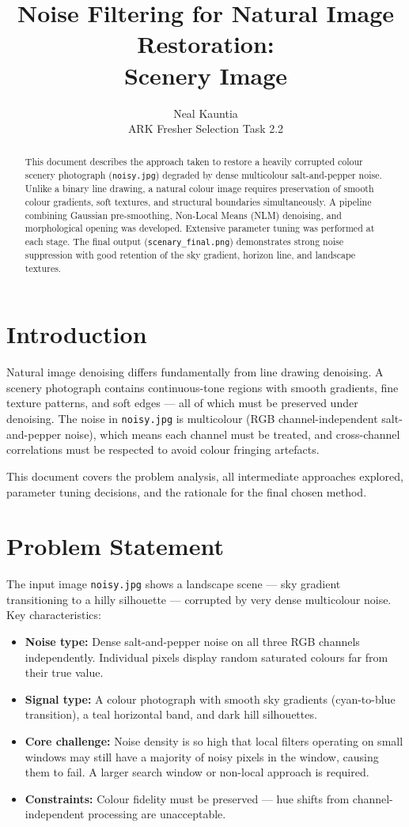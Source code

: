 \documentclass[journal]{IEEEtran}
\title{Noise Filtering for Natural Image Restoration:\\Scenery Image}
\author{Neal Kauntia\\ARK Fresher Selection Task 2.2}
\begin{document}
\maketitle

\begin{abstract}
This document describes the approach taken to restore a heavily corrupted colour scenery 
photograph (\texttt{noisy.jpg}) degraded by dense multicolour salt-and-pepper noise. 
Unlike a binary line drawing, a natural colour image requires preservation of smooth 
colour gradients, soft textures, and structural boundaries simultaneously. A pipeline 
combining Gaussian pre-smoothing, Non-Local Means (NLM) denoising, and morphological 
opening was developed. Extensive parameter tuning was performed at each stage. The 
final output (\texttt{scenary\_final.png}) demonstrates strong noise suppression with 
good retention of the sky gradient, horizon line, and landscape textures.
\end{abstract}

\section{Introduction}
Natural image denoising differs fundamentally from line drawing denoising. A scenery 
photograph contains continuous-tone regions with smooth gradients, fine texture 
patterns, and soft edges — all of which must be preserved under denoising. The noise 
in \texttt{noisy.jpg} is multicolour (RGB channel-independent salt-and-pepper noise), 
which means each channel must be treated, and cross-channel correlations must be 
respected to avoid colour fringing artefacts.

This document covers the problem analysis, all intermediate approaches explored, 
parameter tuning decisions, and the rationale for the final chosen method.

\section{Problem Statement}
The input image \texttt{noisy.jpg} shows a landscape scene — sky gradient transitioning 
to a hilly silhouette — corrupted by very dense multicolour noise. Key characteristics:

\begin{itemize}
    \item \textbf{Noise type:} Dense salt-and-pepper noise on all three RGB channels 
    independently. Individual pixels display random saturated colours far from their 
    true value.
    \item \textbf{Signal type:} A colour photograph with smooth sky gradients 
    (cyan-to-blue transition), a teal horizontal band, and dark hill silhouettes.
    \item \textbf{Core challenge:} Noise density is so high that local filters 
    operating on small windows may still have a majority of noisy pixels in the 
    window, causing them to fail. A larger search window or non-local approach 
    is required.
    \item \textbf{Constraints:} Colour fidelity must be preserved — hue shifts 
    from channel-independent processing are unacceptable.
\end{itemize}
\end{document}
